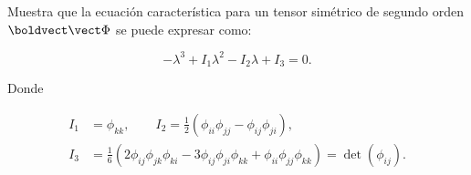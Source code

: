 \documentclass[../main.tex]{subfiles}
\begin{document}
\begin{problema}
	Muestra que la ecuación característica para un tensor simétrico de
	segundo orden \(\vb{\Phi}\) se puede expresar como:

	\begin{equation*}
		-\lambda^{3} + I_{1}\lambda^{2} - I_{2}\lambda + I_{3} = 0.
	\end{equation*}

	Donde

	\begin{align*}
		I_{1} & = \phi_{kk},\qquad I_{2} = \tfrac{1}{2}(\phi_{ii}\phi_{jj} - \phi_{ij}\phi_{ji}), \\
		I_{3} & = \tfrac{1}{6}(2\phi_{ij}\phi_{jk}\phi_{ki} - 3\phi_{ij}\phi_{ji}\phi_{kk}
		+ \phi_{ii}\phi_{jj}\phi_{kk}) = \det(\phi_{ij}).
	\end{align*}
\end{problema}
\end{document}
